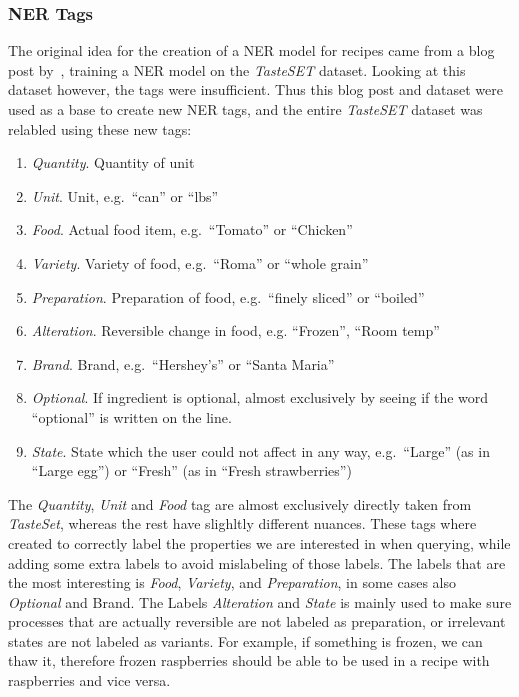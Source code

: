 \documentclass[11pt]{article}
\begin{document}
\subsubsection{NER Tags}\label{sec:ner_tags}
The original idea for the creation of a NER model for recipes came from a blog
post by~\citet{ingNerwb}, training a NER model on the \emph{TasteSET} dataset.
Looking at this dataset however, the tags were insufficient.
Thus this blog post and dataset were used as a base to create new NER tags, and
the entire \emph{TasteSET} dataset was relabled using these new tags:
\begin{enumerate}
    \item \emph{Quantity}. Quantity of unit
    \item \emph{Unit}. Unit, e.g.\ ``can'' or ``lbs''
    \item \emph{Food}. Actual food item, e.g.\ ``Tomato'' or ``Chicken''
    \item \emph{Variety}. Variety of food, e.g.\ ``Roma'' or ``whole grain''
    \item \emph{Preparation}. Preparation of food, e.g.\ ``finely sliced'' or
        ``boiled''
    \item \emph{Alteration}. Reversible change in food, e.g. ``Frozen'', ``Room
        temp''
    \item \emph{Brand}. Brand, e.g.\ ``Hershey's'' or ``Santa Maria''
    \item \emph{Optional}. If ingredient is optional, almost exclusively by
        seeing if the word ``optional'' is written on the line.
    \item \emph{State}. State which the user could not affect in any way, e.g.\
        ``Large'' (as in ``Large egg'') or ``Fresh'' (as in ``Fresh
        strawberries'')
\end{enumerate}

The \emph{Quantity}, \emph{Unit} and \emph{Food} tag are almost exclusively
directly taken from \emph{TasteSet}, whereas the rest have slighltly different
nuances.
These tags where created to correctly label the properties we are interested in
when querying, while adding some extra labels to avoid mislabeling of those
labels.
The labels that are the most interesting is \emph{Food}, \emph{Variety}, and
\emph{Preparation}, in some cases also \emph{Optional} and {Brand}.
The Labels \emph{Alteration} and \emph{State} is mainly used to make sure
processes that are actually reversible are not labeled as preparation, or
irrelevant states are not labeled as variants.
For example, if something is frozen, we can thaw it, therefore frozen
raspberries should be able to be used in a recipe with raspberries and vice
versa.
\end{document}
